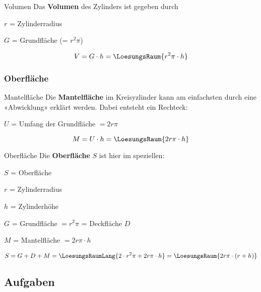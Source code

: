 \begin{gesetz}{Volumen}{}
  Das \textbf{Volumen} des Zylinders ist gegeben durch

  $r$ = Zylinderradius

  $G$ = Grundfläche (= $r^2\pi$)

  $$V = G\cdot{}h = \LoesungsRaum{r^2\pi\cdot{} h}$$
\end{gesetz}
\newpage

\subsubsection{Oberfläche}


\begin{bemerkung}{Mantelfläche}{}
  Die \textbf{Mantelfläche} im Kreisyzlinder kann am einfachsten durch eine «Abwicklung» erklärt werden. Dabei entsteht ein Rechteck:

  $U$ = Umfang der Grundfläche $= 2r\pi$
  
  $$M = U\cdot{}h = \LoesungsRaum{2r\pi\cdot{}h}$$
\end{bemerkung}

\begin{gesetz}{Oberfläche}{}
  Die \textbf{Oberfläche} $S$ ist hier im speziellen:

  $S$ = Oberfläche

  $r$ = Zylinderradius

  $h$ = Zylinderhöhe

  $G$ = Grundfläche $=r^2\pi$ = Deckfläche $D$

  $M$ = Mantelfläche $=2r\pi\cdot{}h$
  
  $$S = G + D + M = \LoesungsRaumLang{2\cdot{}r^2\pi + 2r\pi\cdot{}h} = \LoesungsRaum{2r\pi\cdot{}(r + h)}$$
\end{gesetz}
\newpage

\subsection*{Aufgaben}

\newpage
